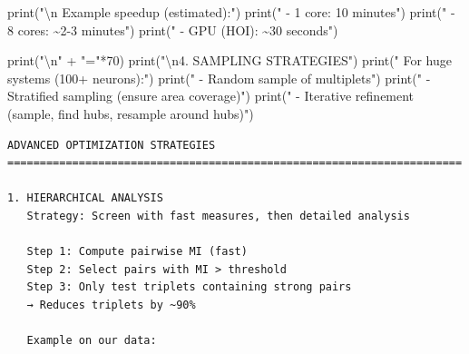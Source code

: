 \documentclass[
  11pt,
  letterpaper,
  oneside,
  openany]{book}
\newenvironment{Shaded}{\begin{snugshade}}{\end{snugshade}}
\newcommand{\BuiltInTok}[1]{\textcolor[rgb]{0.00,0.23,0.31}{#1}}
\newcommand{\CharTok}[1]{\textcolor[rgb]{0.13,0.47,0.30}{#1}}
\newcommand{\DecValTok}[1]{\textcolor[rgb]{0.68,0.00,0.00}{#1}}
\newcommand{\NormalTok}[1]{\textcolor[rgb]{0.00,0.23,0.31}{#1}}
\newcommand{\OperatorTok}[1]{\textcolor[rgb]{0.37,0.37,0.37}{#1}}
\newcommand{\StringTok}[1]{\textcolor[rgb]{0.13,0.47,0.30}{#1}}
\begin{document}
\begin{Shaded}
\begin{Highlighting}[]
\BuiltInTok{print}\NormalTok{(}\StringTok{"}\CharTok{\textbackslash{}n}\StringTok{   Example speedup (estimated):"}\NormalTok{)}
\BuiltInTok{print}\NormalTok{(}\StringTok{"   {-} 1 core: 10 minutes"}\NormalTok{)}
\BuiltInTok{print}\NormalTok{(}\StringTok{"   {-} 8 cores: \textasciitilde{}2{-}3 minutes"}\NormalTok{)}
\BuiltInTok{print}\NormalTok{(}\StringTok{"   {-} GPU (HOI): \textasciitilde{}30 seconds"}\NormalTok{)}

\BuiltInTok{print}\NormalTok{(}\StringTok{"}\CharTok{\textbackslash{}n}\StringTok{"} \OperatorTok{+} \StringTok{"="}\OperatorTok{*}\DecValTok{70}\NormalTok{)}
\BuiltInTok{print}\NormalTok{(}\StringTok{"}\CharTok{\textbackslash{}n}\StringTok{4. SAMPLING STRATEGIES"}\NormalTok{)}
\BuiltInTok{print}\NormalTok{(}\StringTok{"   For huge systems (100+ neurons):"}\NormalTok{)}
\BuiltInTok{print}\NormalTok{(}\StringTok{"   {-} Random sample of multiplets"}\NormalTok{)}
\BuiltInTok{print}\NormalTok{(}\StringTok{"   {-} Stratified sampling (ensure area coverage)"}\NormalTok{)}
\BuiltInTok{print}\NormalTok{(}\StringTok{"   {-} Iterative refinement (sample, find hubs, resample around hubs)"}\NormalTok{)}
\end{Highlighting}
\end{Shaded}

\begin{verbatim}
ADVANCED OPTIMIZATION STRATEGIES
======================================================================

1. HIERARCHICAL ANALYSIS
   Strategy: Screen with fast measures, then detailed analysis

   Step 1: Compute pairwise MI (fast)
   Step 2: Select pairs with MI > threshold
   Step 3: Only test triplets containing strong pairs
   → Reduces triplets by ~90%

   Example on our data:
\end{verbatim}
\end{document}

